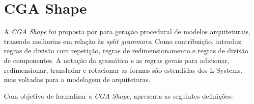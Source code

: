 \begin{figure}[h!]
	\centering
	\captionsetup{width=15cm}
	{}	
\end{figure}

\begin{figure}[h!]
	\centering
	\captionsetup{width=15cm}
	{}	
\end{figure}

\newpage

\section{CGA Shape}
\label{sec:cga}

A \textit{CGA Shape} foi proposta por  para geração procedural de modelos arquiteturais, trazendo melhorias em relação às \textit{split grammars}. Como contribuição, introduz regras de divisão com repetição, regras de redimensionamento e regras de divisão de componentes. A notação da gramática e as regras gerais para adicionar, redimensionar, transladar e rotacionar as formas são estendidas dos \gls{L-Systems}, mas voltadas para a modelagem de arquiteturas.

Com objetivo de formalizar a \textit{CGA Shape},  apresenta as seguintes definições:

